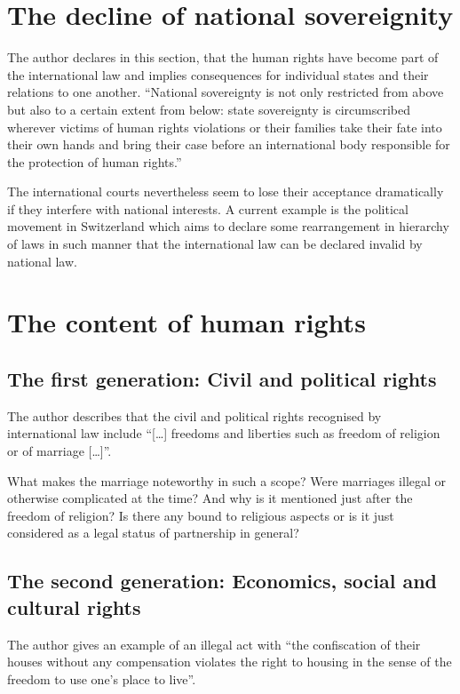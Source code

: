 \section{The decline of national sovereignity}
The author declares in this section, that the human rights have become
part of the international law and implies consequences for individual states
and their relations to one another. ``National sovereignty is not only
restricted from above but also to a certain extent from below: state
sovereignty is circumscribed wherever victims of human rights violations
or their families take their fate into their own hands and bring their case
before an international body responsible for the protection of human rights.''
\cite[p. 19,21]{tfohr}

The international courts nevertheless seem to lose their acceptance
dramatically if they interfere with national interests. A current example is
the political movement in Switzerland which aims to declare some
rearrangement in hierarchy of laws in such manner that the international law
can be declared invalid by national law.
\cite{svp}

\section{The content of human rights}

\subsection{The first generation: Civil and political rights}
The author describes that the civil and political rights recognised by
international law include ``[\dots] freedoms and liberties such as
freedom of religion or of marriage [\dots]''.
\cite[p. 21]{tfohr}

What makes the marriage noteworthy in such a scope? Were marriages
illegal or otherwise complicated at the time? And why is it mentioned
just after the freedom of religion? Is there any bound to religious
aspects or is it just considered as a legal status of partnership in
general? 

\subsection{The second generation: Economics, social and cultural rights}
The author gives an example of an illegal act with ``the confiscation
of their houses without any compensation violates the right to housing
in the sense of the freedom to use one's place to live''.
\cite[p. 23]{tfohr}

